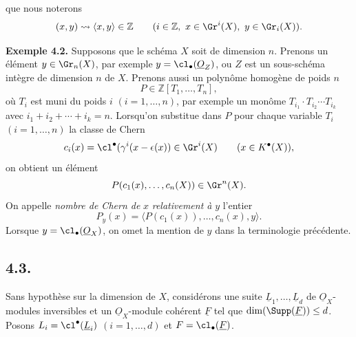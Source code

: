 
que nous noterons
\[
 (x,y)\rightsquigarrow \langle x,y\rangle\in\mathbb Z
 \qquad (i\in\mathbb Z,\ x\in\Gr^i(X),\ y\in\Gr_i(X)).
\]

\textbf{Exemple 4.2.} Supposons que le schéma \(X\) soit de dimension \(n\). Prenons un élément \(y\in\Gr_n(X)\), par exemple \(y=\cl_\bullet(\underline{O}_Z)\), ou \(Z\) est un sous-schéma intègre de dimension \(n\) de \(X\). Prenons aussi un polynôme homogène de poids \(n\)
\[
 P\in\mathbb Z[T_1,\ldots,T_n],
\]
où \(T_i\) est muni du poids \(i\) \((i=1,\ldots,n)\), par exemple un monôme \(T_{i_1}\cdot T_{i_2}\cdots T_{i_k}\) avec \(i_1+i_2+\cdots+i_k=n\). Lorsqu'on substitue dans \(P\) pour chaque variable \(T_i\) \((i=1,\ldots,n)\) la classe de Chern
\[
 c_i(x)=\cl^{\bullet}(\gamma^i(x-\epsilon(x))\in\Gr^i(X)
 \qquad(x\in K^{\bullet}(X)),
\]
on obtient un élément
\[
 P(c_1(x),\ldots,c_n(X))\in\Gr^n(X).
\]
On appelle \emph{nombre de Chern de} \(x\) \emph{relativement à} \(y\) l'entier
\[
 P_y(x)=\bigl\langle P(c_1(x)),\ldots,c_n(x),y\bigr\rangle.
\]
Lorsque \(y=\cl_\bullet(\underline{O}_X)\), on omet la mention de \(y\) dans la terminologie précédente.

\subsection*{4.3.}
Sans hypothèse sur la dimension de \(X\), considérons une suite \(\underline{L}_1,\ldots,\underline{L}_d\) de \(\underline{O}_X\)-modules inversibles et un \(\underline{O}_X\)-module cohérent \(\underline{F}\) tel que \(\dim(\Supp(\underline{F}))\leq d\). Posons \(L_i=\cl^{\bullet}(\underline L_i)\) \((i=1,\ldots,d)\) et \(F=\cl_\bullet(\underline F)\).

